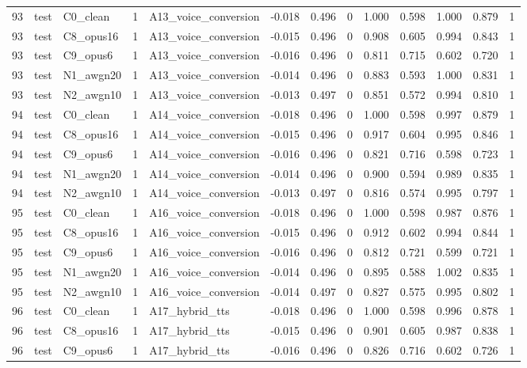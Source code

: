\begin{tabular}{rllrlrrrrrrrr}
93 & test & C0_clean & 1 & A13_voice_conversion & -0.018 & 0.496 & 0 & 1.000 & 0.598 & 1.000 & 0.879 & 1 \\
93 & test & C8_opus16 & 1 & A13_voice_conversion & -0.015 & 0.496 & 0 & 0.908 & 0.605 & 0.994 & 0.843 & 1 \\
93 & test & C9_opus6 & 1 & A13_voice_conversion & -0.016 & 0.496 & 0 & 0.811 & 0.715 & 0.602 & 0.720 & 1 \\
93 & test & N1_awgn20 & 1 & A13_voice_conversion & -0.014 & 0.496 & 0 & 0.883 & 0.593 & 1.000 & 0.831 & 1 \\
93 & test & N2_awgn10 & 1 & A13_voice_conversion & -0.013 & 0.497 & 0 & 0.851 & 0.572 & 0.994 & 0.810 & 1 \\
94 & test & C0_clean & 1 & A14_voice_conversion & -0.018 & 0.496 & 0 & 1.000 & 0.598 & 0.997 & 0.879 & 1 \\
94 & test & C8_opus16 & 1 & A14_voice_conversion & -0.015 & 0.496 & 0 & 0.917 & 0.604 & 0.995 & 0.846 & 1 \\
94 & test & C9_opus6 & 1 & A14_voice_conversion & -0.016 & 0.496 & 0 & 0.821 & 0.716 & 0.598 & 0.723 & 1 \\
94 & test & N1_awgn20 & 1 & A14_voice_conversion & -0.014 & 0.496 & 0 & 0.900 & 0.594 & 0.989 & 0.835 & 1 \\
94 & test & N2_awgn10 & 1 & A14_voice_conversion & -0.013 & 0.497 & 0 & 0.816 & 0.574 & 0.995 & 0.797 & 1 \\
95 & test & C0_clean & 1 & A16_voice_conversion & -0.018 & 0.496 & 0 & 1.000 & 0.598 & 0.987 & 0.876 & 1 \\
95 & test & C8_opus16 & 1 & A16_voice_conversion & -0.015 & 0.496 & 0 & 0.912 & 0.602 & 0.994 & 0.844 & 1 \\
95 & test & C9_opus6 & 1 & A16_voice_conversion & -0.016 & 0.496 & 0 & 0.812 & 0.721 & 0.599 & 0.721 & 1 \\
95 & test & N1_awgn20 & 1 & A16_voice_conversion & -0.014 & 0.496 & 0 & 0.895 & 0.588 & 1.002 & 0.835 & 1 \\
95 & test & N2_awgn10 & 1 & A16_voice_conversion & -0.014 & 0.497 & 0 & 0.827 & 0.575 & 0.995 & 0.802 & 1 \\
96 & test & C0_clean & 1 & A17_hybrid_tts & -0.018 & 0.496 & 0 & 1.000 & 0.598 & 0.996 & 0.878 & 1 \\
96 & test & C8_opus16 & 1 & A17_hybrid_tts & -0.015 & 0.496 & 0 & 0.901 & 0.605 & 0.987 & 0.838 & 1 \\
96 & test & C9_opus6 & 1 & A17_hybrid_tts & -0.016 & 0.496 & 0 & 0.826 & 0.716 & 0.602 & 0.726 & 1 \\

\end{tabular}
